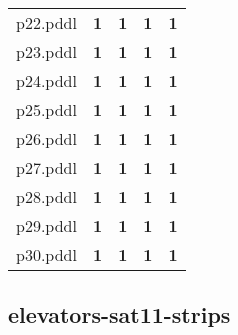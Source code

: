 \documentclass{article}
\begin{document}
\begin{tabular}{@{}lrrrr@{}}
p22.pddl & \textbf{1} & \textbf{1} & \textbf{1} & \textbf{1} \\
p23.pddl & \textbf{1} & \textbf{1} & \textbf{1} & \textbf{1} \\
p24.pddl & \textbf{1} & \textbf{1} & \textbf{1} & \textbf{1} \\
p25.pddl & \textbf{1} & \textbf{1} & \textbf{1} & \textbf{1} \\
p26.pddl & \textbf{1} & \textbf{1} & \textbf{1} & \textbf{1} \\
p27.pddl & \textbf{1} & \textbf{1} & \textbf{1} & \textbf{1} \\
p28.pddl & \textbf{1} & \textbf{1} & \textbf{1} & \textbf{1} \\
p29.pddl & \textbf{1} & \textbf{1} & \textbf{1} & \textbf{1} \\
p30.pddl & \textbf{1} & \textbf{1} & \textbf{1} & \textbf{1} \\
\end{tabular}

\hypertarget{coverage-elevators-sat11-strips}{}
\subsection*{elevators-sat11-strips}
\end{document}
